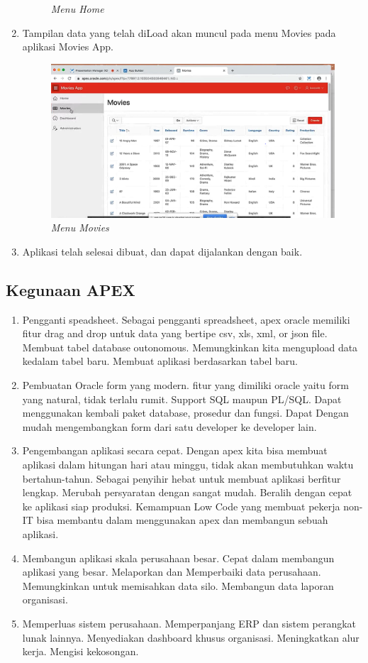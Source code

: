 \begin{enumerate}
\begin{figure}[H]
    \caption{\textit{Menu Home}}
    \label{Menu1}
\end{figure}
\item Tampilan data yang telah diLoad akan muncul pada menu Movies pada aplikasi Movies App.
 \begin{figure}[H]
    \centering
    \includegraphics[scale=0.5]{figures/22}
    \caption{\textit{Menu Movies}}
    \label{Menu2}
\end{figure}
\item Aplikasi telah selesai dibuat, dan dapat dijalankan dengan baik.
\end{enumerate}

\subsection{Kegunaan APEX}
\begin{enumerate}
 \item Pengganti speadsheet. Sebagai pengganti spreadsheet, apex oracle memiliki fitur drag and drop untuk data yang bertipe csv, xls, xml, or json file. Membuat tabel database outonomous. Memungkinkan kita mengupload data kedalam tabel baru. Membuat aplikasi berdasarkan tabel baru.
 \item Pembuatan Oracle form yang modern. fitur yang dimiliki oracle yaitu form yang natural, tidak terlalu rumit. Support SQL maupun PL/SQL. Dapat menggunakan kembali paket database, prosedur dan fungsi. Dapat Dengan mudah mengembangkan form dari satu developer ke developer lain.
 \item Pengembangan aplikasi secara cepat. Dengan apex kita bisa membuat aplikasi dalam hitungan hari atau minggu, tidak akan membutuhkan waktu bertahun-tahun. Sebagai penyihir hebat untuk membuat aplikasi berfitur lengkap. Merubah persyaratan dengan sangat mudah. Beralih dengan cepat ke aplikasi siap produksi. Kemampuan Low Code yang membuat pekerja non-IT bisa membantu dalam menggunakan apex dan membangun sebuah aplikasi.
 \item Membangun aplikasi skala perusahaan besar. Cepat dalam membangun aplikasi yang besar. Melaporkan dan Memperbaiki data perusahaan. Memungkinkan untuk memisahkan data silo. Membangun data laporan organisasi.
 \item Memperluas sistem perusahaan. Memperpanjang ERP dan sistem perangkat lunak lainnya. Menyediakan dashboard khusus organisasi. Meningkatkan alur kerja. Mengisi kekosongan.
\end{enumerate}

